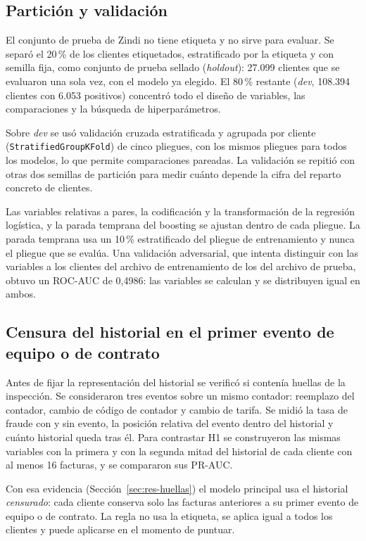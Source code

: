 \subsection{Partición y validación}

El conjunto de prueba de Zindi no tiene etiqueta y no sirve para evaluar. Se separó el
20\,\% de los clientes etiquetados, estratificado por la etiqueta y con semilla fija, como
conjunto de prueba sellado (\textit{holdout}): 27.099 clientes que se evaluaron una sola
vez, con el modelo ya elegido. El 80\,\% restante (\textit{dev}, 108.394 clientes con 6.053
positivos) concentró todo el diseño de variables, las comparaciones y la búsqueda de
hiperparámetros.

Sobre \textit{dev} se usó validación cruzada estratificada y agrupada por cliente
(\texttt{StratifiedGroupKFold}) de cinco pliegues, con los mismos pliegues para todos los
modelos, lo que permite comparaciones pareadas. La validación se repitió con otras dos
semillas de partición para medir cuánto depende la cifra del reparto concreto de clientes.

Las variables relativas a pares, la codificación y la transformación de la regresión
logística, y la parada temprana del boosting se ajustan dentro de cada pliegue. La parada
temprana usa un 10\,\% estratificado del pliegue de entrenamiento y nunca el pliegue que se
evalúa. Una validación adversarial, que intenta distinguir con las variables a los clientes
del archivo de entrenamiento de los del archivo de prueba, obtuvo un ROC-AUC de 0,4986: las
variables se calculan y se distribuyen igual en ambos.

\subsection{Censura del historial en el primer evento de equipo o de contrato}

Antes de fijar la representación del historial se verificó si contenía huellas de la
inspección. Se consideraron tres eventos sobre un mismo contador: reemplazo del contador,
cambio de código de contador y cambio de tarifa. Se midió la tasa de fraude con y sin
evento, la posición relativa del evento dentro del historial y cuánto historial queda tras
él. Para contrastar H1 se construyeron las mismas variables con la primera y con la segunda
mitad del historial de cada cliente con al menos 16 facturas, y se compararon sus PR-AUC.

Con esa evidencia (Sección~\ref{sec:res-huellas}) el modelo principal usa el historial
\emph{censurado}: cada cliente conserva solo las facturas anteriores a su primer evento de
equipo o de contrato. La regla no usa la etiqueta, se aplica igual a todos los clientes y
puede aplicarse en el momento de puntuar.

